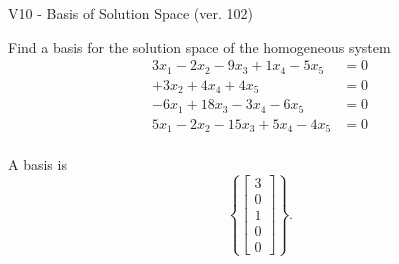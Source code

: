 \begin{exercise}
  \begin{exerciseTitle}V10 - Basis of Solution Space (ver. 102)\end{exerciseTitle}
  \begin{exerciseStatement}
    Find a basis for the solution space of the homogeneous system 
\begin{align*}
 3 x_ 1 -2 x_ 2 -9 x_ 3 + 1 x_ 4 -5 x_ 5 &= 0  \\ 
  + 3 x_ 2 + 4 x_ 4 + 4 x_ 5 &= 0  \\ 
  -6 x_ 1 + 18 x_ 3 -3 x_ 4 -6 x_ 5 &= 0  \\ 
  5 x_ 1 -2 x_ 2 -15 x_ 3 + 5 x_ 4 -4 x_ 5 &= 0  \\ 
 \end{align*}


 
  \end{exerciseStatement}

  \begin{exerciseAnswer}
   A basis is   
\[\left\{\left[\begin{array}{c}
3 \\
0 \\
1 \\
0 \\
0
\end{array}\right]\right\}.\]

  


  \end{exerciseAnswer}
\end{exercise}